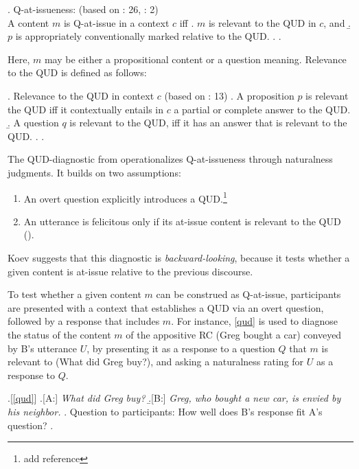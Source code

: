 \documentclass[times,linguex,xcolor]{glossa}
\begin{document}
    \ex. \label{def:qai}%
      Q-at-issueness: \hfill (based on \citealt{simons_what_2010}: 26, \citealt{koev_notions_2018}: 2)\\
        A content $m$ is Q-at-issue in a context $c$ iff
        \a. \label{def:qai-relevant}%
          $m$ is relevant to the QUD in $c$, and
        \b.  \label{def:qai-conventional}%
          $p$ is appropriately conventionally marked relative to the QUD.
        \z. 
      \z.

      Here, $m$ may be either a propositional content or a question meaning. Relevance to the QUD is defined as follows:

      \ex. Relevance to the QUD in context $c$ \hfill (based on \citealt{simons_what_2010}: 13)
        \a. A proposition $p$ is relevant the QUD iff it contextually entails in $c$ a partial or complete answer to the QUD.
        \b. A question $q$ is relevant to the QUD, iff it has an answer that is relevant to the QUD.
        \z.
      \z.

      The QUD-diagnostic from \citealt{tonhauser_diagnosing_2012} operationalizes Q-at-issueness through naturalness judgments. It builds on two assumptions:
      \begin{enumerate}
        \item An overt question explicitly introduces a QUD.\footnote{add reference}
        \item An utterance is felicitous only if its at-issue content is relevant to the QUD (\citealt{amaral_review_2007,tonhauser_diagnosing_2012}).
      \end{enumerate}

      Koev suggests that this diagnostic is \emph{backward-looking}, because it tests whether a given content is at-issue relative to the previous discourse.

      \noindent To test whether a given content $m$ can be construed as Q-at-issue, participants are presented with a context that establishes a QUD via an overt question, followed by a response that includes $m$. For instance, \ref{qud} is used to diagnose the status of the content $m$ of the appositive RC (Greg bought a car) conveyed by B's utterance $U$, by presenting it as a response to a question $Q$ that $m$ is relevant to (What did Greg buy?), and asking a naturalness rating for $U$ as a response to $Q$.

      \ex.[\ref{qud}]
        \a.[A:] \emph{What did Greg buy?}
        \b.[B:] \emph{Greg, who bought a new car, is envied by his neighbor.}
        \z.
        Question to participants: How well does B's response fit A's question?
      \z.
\end{document}
